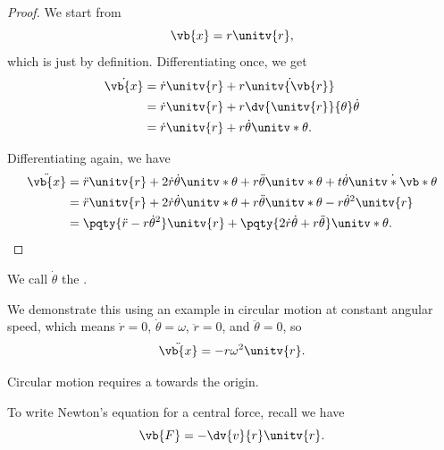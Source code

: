 \begin{proof}
    We start from
    \begin{equation}
        \vb{x} = r \unitv{r},
    \end{equation}
    which is just by definition. Differentiating once, we get
    \begin{subequations}\begin{align}
        \dot{\vb{x}} &= \dot{r} \unitv{r} + r \dot{\unitv{\vb{r}}} \\
        &= \dot{r} \unitv{r} + r \dv{\unitv{r}}{\theta} \dot{\theta} \\
        &= \dot{r} \unitv{r} + r \dot{\theta} \unitv*{\theta}.
    \end{align}\end{subequations}

    Differentiating again, we have
    \begin{subequations}\begin{align}
        \ddot{\vb{x}} &= \ddot{r} \unitv{r} + 2 \dot{r} \dot{\theta} \unitv*{\theta} + r \ddot{\theta} \unitv*{\theta} + t \dot{\theta} \dot{\unitv*{\vb*{\theta}}} \\
        &= \ddot{r} \unitv{r} + 2 \dot{r} \dot{\theta} \unitv*{\theta} + r \ddot{\theta} \unitv*{\theta} - r \dot{\theta}^2 \unitv{r} \\
        &= \pqty{\ddot{r} - r \dot{\theta}^2} \unitv{r} + \pqty{2 \dot{r} \dot{\theta} + r \ddot{\theta}} \unitv*{\theta}.
    \end{align}\end{subequations}
\end{proof}

We call \(\dot{\theta}\) the .

\begin{example}
    \label{ex:circular-motion}
    We demonstrate this using an example in circular motion at constant angular speed, which means \(\dot{r} = 0\), \(\dot{\theta} = \omega\), \(\ddot{r} = 0\), and \(\ddot{\theta} = 0\), so
    \begin{equation}
        \ddot{\vb{x}} = - r \omega^2 \unitv{r}.
    \end{equation}
    
    Circular motion requires a  towards the origin.
\end{example}

To write Newton's equation for a central force, recall we have
\begin{equation}
    \vb{F} = - \dv{v}{r} \unitv{r}.
\end{equation}

